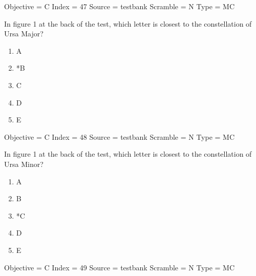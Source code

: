 \documentclass[11pt]{article}
\begin{document}
\begin{enumerate}
\begin{minipage}{\textwidth}
\begin{minipage}{\textwidth}
Objective = C
Index = 47
Source = testbank
Scramble = N
Type = MC
\end{minipage}
\end{minipage}
\vskip 0.20in

\begin{minipage}{\textwidth}
\begin{minipage}{\textwidth}
\item In figure 1 at the back of the test, which letter is closest to the constellation of Ursa Major?
\begin{multicols}{3}
\begin{enumerate} 
\setlength{\itemsep}{1pt} 
\setlength{\parskip}{0pt} 
\setlength{\parsep}{0pt}
\setlength{\multicolsep}{1pt} 
\item A
\item *B
\item C
\item D
\item E
\end{enumerate} 
\vfill 
\end{multicols}

Objective = C
Index = 48
Source = testbank
Scramble = N
Type = MC
\end{minipage}
\end{minipage}
\vskip 0.20in

\begin{minipage}{\textwidth}
\begin{minipage}{\textwidth}
\item In figure 1 at the back of the test, which letter is closest to the constellation of Ursa Minor?
\begin{multicols}{3}
\begin{enumerate} 
\setlength{\itemsep}{1pt} 
\setlength{\parskip}{0pt} 
\setlength{\parsep}{0pt}
\setlength{\multicolsep}{1pt} 
\item A
\item B
\item *C
\item D
\item E
\end{enumerate} 
\vfill 
\end{multicols}

Objective = C
Index = 49
Source = testbank
Scramble = N
Type = MC
\end{minipage}
\end{minipage}
\vskip 0.20in

\end{enumerate}
\end{document}
